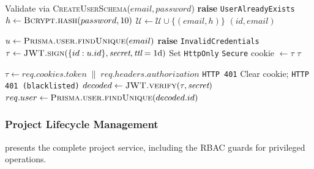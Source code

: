 \begin{algorithm}[H]
\caption{Authentication Pipeline (\texttt{user.service.ts},
  \texttt{auth.middleware.ts}, \texttt{redis.service.ts})}
\label{alg:auth_pipeline}
\begin{algorithmic}[1]
  \State Validate via \textsc{CreateUserSchema}($email, password$) 
    \State \textbf{raise} \texttt{UserAlreadyExists}
  \EndIf
  \State $h \gets \textsc{Bcrypt.hash}(password, 10)$ 
  \State $\mathcal{U} \gets \mathcal{U} \cup \{(email, h)\}$ 
  \State \Return $(id, email)$
\EndProcedure

  \State $u \gets \textsc{Prisma.user.findUnique}(email)$
    \State \textbf{raise} \texttt{InvalidCredentials}
  \EndIf
  \State $\tau \gets \textsc{JWT.sign}(\{id: u.id\}, \textit{secret}, \textit{ttl}=\text{1d})$
  \State Set \texttt{HttpOnly} \texttt{Secure} cookie $\leftarrow \tau$
  \State \Return $\tau$
\EndProcedure

  \State $\tau \gets req.cookies.token \;\|\; req.headers.authorization$
  \If{$\tau = \emptyset$} \Return \texttt{HTTP 401} \EndIf
    \State Clear cookie; \Return \texttt{HTTP 401 (blacklisted)}
  \EndIf
  \State $decoded \gets \textsc{JWT.verify}(\tau, \textit{secret})$
  \State $req.user \gets \textsc{Prisma.user.findUnique}(decoded.id)$
  \State {}
\EndProcedure
\end{algorithmic}
\end{algorithm}

\subsubsection{Project Lifecycle Management}

 presents the complete project service, including
the RBAC guards for privileged operations.

